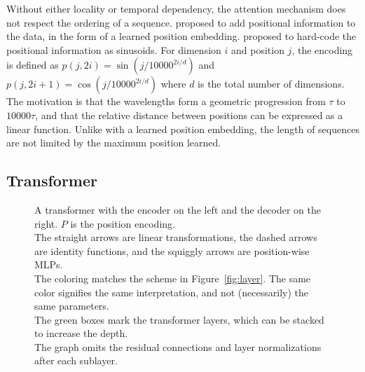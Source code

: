 \documentclass[11pt,twocolumn]{article}
\begin{document}
Without either locality or temporal dependency,
the attention mechanism does not respect the ordering of a sequence.
\textcite{gehring2017convolutional} proposed to add positional information to the data,
in the form of a learned position embedding.
\textcite{vaswani2017attention} proposed to hard-code the positional information as sinusoids.
For dimension \(i\) and position \(j\), the encoding is defined as
\(p(j, 2i) = \sin \left( j / 10000^{2i/d} \right)\) and
\(p(j, 2i+1) = \cos \left( j / 10000^{2i/d} \right)\)
where \(d\) is the total number of dimensions.
The motivation is that the wavelengths form a geometric progression from \(\tau\) to \(10000 \tau\),
and that the relative distance between positions can be expressed as a linear function.
Unlike with a learned position embedding,
the length of sequences are not limited by the maximum position learned.

\subsection{Transformer}

\begin{figure}
  \centering
  \caption[]{\label{fig:transformer}A transformer
    with the encoder on the left and the decoder on the right.
    \(P\) is the position encoding.\\
    The straight arrows are linear transformations,
    the dashed arrows are identity functions,
    and the squiggly arrows are position-wise MLPs.\\
    The coloring matches the scheme in Figure~\ref{fig:layer}.
    The same color signifies the same interpretation,
    and not (necessarily) the same parameters.\\
    The green boxes mark the transformer layers,
    which can be stacked to increase the depth.\\
    The graph omits the residual connections and layer normalizations after each sublayer.}
\end{figure}
\end{document}
